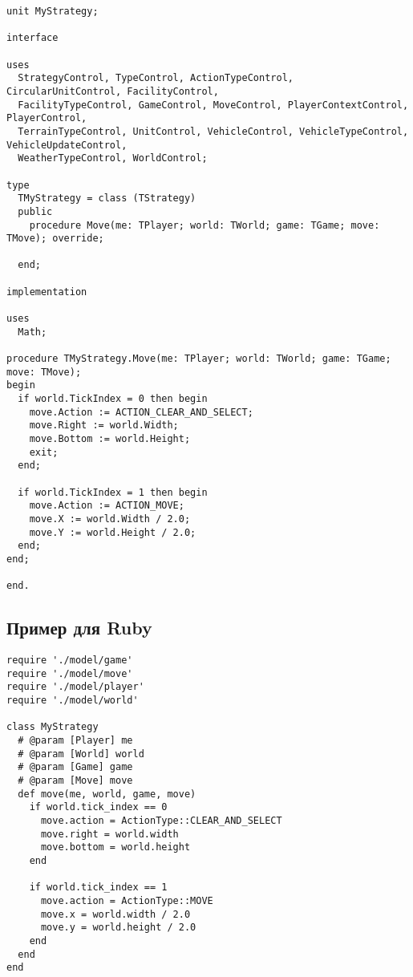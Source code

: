 \begin{verbatim}
unit MyStrategy;

interface

uses
  StrategyControl, TypeControl, ActionTypeControl, CircularUnitControl, FacilityControl,
  FacilityTypeControl, GameControl, MoveControl, PlayerContextControl, PlayerControl,
  TerrainTypeControl, UnitControl, VehicleControl, VehicleTypeControl, VehicleUpdateControl,
  WeatherTypeControl, WorldControl;

type
  TMyStrategy = class (TStrategy)
  public
    procedure Move(me: TPlayer; world: TWorld; game: TGame; move: TMove); override;

  end;

implementation

uses
  Math;
    
procedure TMyStrategy.Move(me: TPlayer; world: TWorld; game: TGame; move: TMove);
begin
  if world.TickIndex = 0 then begin
    move.Action := ACTION_CLEAR_AND_SELECT;
    move.Right := world.Width;
    move.Bottom := world.Height;
    exit;
  end;

  if world.TickIndex = 1 then begin
    move.Action := ACTION_MOVE;
    move.X := world.Width / 2.0;
    move.Y := world.Height / 2.0;
  end;
end;

end.
\end{verbatim}

\newpage
\subsection{Пример для Ruby}

\begin{verbatim}
require './model/game'
require './model/move'
require './model/player'
require './model/world'

class MyStrategy
  # @param [Player] me
  # @param [World] world
  # @param [Game] game
  # @param [Move] move
  def move(me, world, game, move)
    if world.tick_index == 0
      move.action = ActionType::CLEAR_AND_SELECT
      move.right = world.width
      move.bottom = world.height
    end

    if world.tick_index == 1
      move.action = ActionType::MOVE
      move.x = world.width / 2.0
      move.y = world.height / 2.0
    end
  end
end
\end{verbatim}
